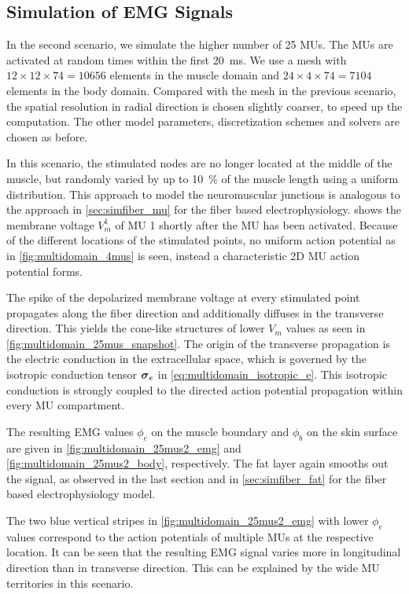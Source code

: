 \subsection{Simulation of EMG Signals}\label{sec:multidomain_simulation_emg}

In the second scenario, we simulate the higher number of 25 MUs. The MUs are activated at random times within the first \SI{20}{\ms}. We use a mesh with $12 \times 12 \times 74 = \num{10656}$ elements in the muscle domain and $24 \times 4 \times 74 = 7104$ elements in the body domain. Compared with the mesh in the previous scenario, the spatial resolution in radial direction is chosen slightly coarser, to speed up the computation.
The other model parameters, discretization schemes and solvers are chosen as before.

In this scenario, the stimulated nodes are no longer located at the middle of the muscle, but randomly varied by up to \SI{10}{\percent} of the muscle length using a uniform distribution. This approach to model the neuromuscular junctions is analogous to the approach in \cref{sec:simfiber_mu} for the fiber based electrophysiology. 
 shows the membrane voltage $V_m^1$ of MU 1 shortly after the MU has been activated. Because of the different locations of the stimulated points, no uniform action potential  as in \cref{fig:multidomain_4mus} is seen, instead a characteristic 2D MU action potential forms. 

The spike of the depolarized membrane voltage at every stimulated point propagates along the fiber direction and additionally diffuses in the transverse direction. This yields the cone-like structures of lower $V_m$ values as  seen in \cref{fig:multidomain_25mus_snapshot}. The origin of the transverse propagation is the electric conduction in the extracellular space, which is governed by the isotropic conduction tensor $\boldsymbol{\sigma}_e$ in \cref{eq:multidomain_isotropic_e}. This isotropic conduction is strongly coupled to the directed action potential propagation within every MU compartment.

The resulting EMG values $\phi_e$ on the muscle boundary and $\phi_b$ on the skin surface are given in \cref{fig:multidomain_25mus2_emg} and \cref{fig:multidomain_25mus2_body}, respectively. The fat layer again smooths out the signal, as observed in the last section and in \cref{sec:simfiber_fat} for the fiber based electrophysiology model.

The two blue vertical stripes in \cref{fig:multidomain_25mus2_emg} with lower $\phi_e$ values correspond to the action potentials of multiple MUs at the respective location. It can be seen that the resulting EMG signal varies more in longitudinal direction than in transverse direction. This can be explained by the wide MU territories in this scenario.

